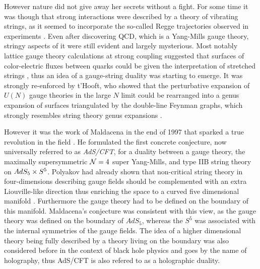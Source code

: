 However nature did not give away her secrets without a fight. 
For some time it was though that strong interactions were described by a theory of vibrating strings, as it seemed to incorporate the so-called Regge trajectories observed in experiments \cite{Veneziano:1968}. 
Even after discovering QCD, which is a Yang-Mills gauge theory, stringy aspects of it were still evident and largely mysterious. 
Most notably lattice gauge theory calculations at strong coupling suggested that surfaces of color-electric fluxes between quarks could be given the interpretation of stretched strings \cite{Wilson:1974}, thus an idea of a gauge-string duality was starting to emerge. 
It was strongly re-enforced by t'Hooft, who showed that the perturbative expansion of $U(N)$ gauge theories in the large $N$ limit could be rearranged into a genus expansion of surfaces triangulated by the double-line Feynman graphs, which strongly resembles string theory genus expansions \cite{THooft:1974}.

\vspace{20pt}
\newlength\yearposx
{}
\vspace{20pt}

However it was the work of Maldacena in the end of 1997 that sparked a true revolution in the field \cite{Maldacena:1997re}. 
He formulated the first concrete conjecture, now universally referred to as \emph{AdS/CFT}, for a duality between a gauge theory, the maximally supersymmetric $\mathcal{N}=4$ super Yang-Mills, and type IIB string theory on $AdS_5 \times S^5$. 
Polyakov had already shown that non-critical string theory in four-dimensions describing gauge fields should be complemented with an extra Liouville-like direction thus enriching the space to a curved five dimensional manifold \cite{Polyakov:1997tj}. Furthermore the gauge theory had to be defined on the boundary of this manifold.
Maldacena's conjecture was consistent with this view, as the gauge theory was defined on the boundary of $AdS_5$, whereas the $S^5$ was associated with the internal symmetries of the gauge fields.
The idea of a higher dimensional theory being fully described by a theory living on the boundary was also considered before in the context of black hole physics \cite{'tHooft:1993gx, Susskind:1994vu} and goes by the name of holography, thus AdS/CFT is also refered to as a holographic duality.


